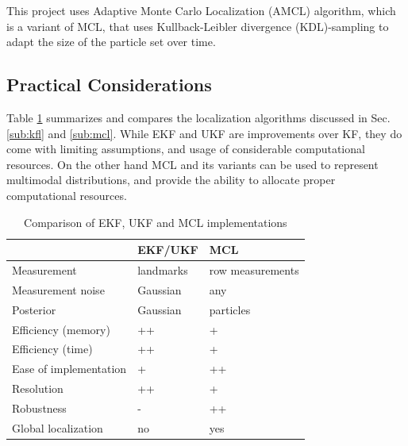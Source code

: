 \documentclass[10pt,journal,compsoc]{IEEEtran}
\begin{document}
This project uses Adaptive Monte Carlo Localization  (AMCL) algorithm, which is a variant of MCL, that uses Kullback-Leibler divergence (KDL)-sampling to adapt the size of the particle set over time. 

\subsection{Practical Considerations}

Table \ref{tab:comp} summarizes and compares the localization algorithms discussed in Sec. \ref{sub:kfl} and \ref{sub:mcl}. While EKF and UKF are improvements over KF, they do come with limiting assumptions, and usage of considerable computational resources. On the other hand MCL and its variants can be used to represent multimodal distributions, and provide the ability to allocate proper computational resources.    

\begin{table}[h]
\caption{Comparison of EKF, UKF and MCL implementations}
\label{tab:comp}
\begin{center}
\begin{tabular}{|l||l|l|}
\hline
& EKF/UKF & MCL\\
\hline
Measurement & landmarks & row measurements\\
Measurement noise  & Gaussian & any\\
Posterior & Gaussian & particles\\
Efficiency (memory) & ++ &+\\
Efficiency (time) & ++ & +\\
Ease of implementation & + & ++\\
Resolution & ++ & +\\
Robustness & - & ++\\
Global localization & no & yes\\
\hline
\end{tabular}
\end{center}
\end{table}




%
%
\end{document}
